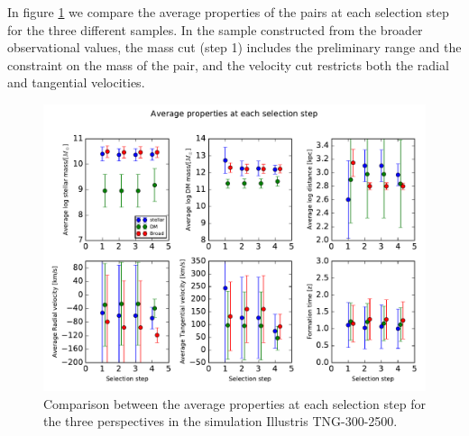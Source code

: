 \documentclass[fleqn,usenatbib]{mnras}
\begin{document}
In figure \ref{fig:prop_persp} we compare the average properties of the pairs at each selection step for the three different samples. In the sample constructed from the broader observational values, the mass cut (step 1) includes the preliminary range and the constraint on the mass of the pair, and the velocity cut restricts both the radial and tangential velocities. 
\begin{figure}
\centering
\includegraphics[scale=0.5]{avgProp/ALLavgProps_205_2500.pdf}
\caption{\label{fig:prop_persp} Comparison between the average properties at each selection step for the three perspectives in the simulation Illustris TNG-300-2500.}
\end{figure}
\end{document}
